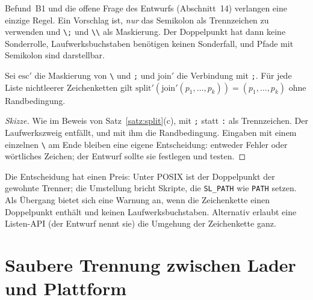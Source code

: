 Befund~B1 und die offene Frage des Entwurfs (Abschnitt~14) verlangen eine einzige Regel. Ein Vorschlag ist, \emph{nur} das Semikolon als Trennzeichen zu verwenden und \texttt{\textbackslash;} und \texttt{\textbackslash\textbackslash} als Maskierung. Der Doppelpunkt hat dann keine Sonderrolle, Laufwerksbuchstaben benötigen keinen Sonderfall, und Pfade mit Semikolon sind darstellbar.

\begin{satz}
	Sei $\mathrm{esc}'$ die Maskierung von \texttt{\textbackslash} und \texttt{;} und $\mathrm{join}'$ die Verbindung mit \texttt{;}. Für jede Liste nichtleerer Zeichenketten gilt $\mathrm{split}'(\mathrm{join}'(p_1,\ldots,p_k))=(p_1,\ldots,p_k)$ ohne Randbedingung.
\end{satz}

\begin{proof}[Skizze]
	Wie im Beweis von Satz~\ref{satz:split}(c), mit \texttt{;} statt \texttt{:} als Trennzeichen. Der Laufwerkszweig entfällt, und mit ihm die Randbedingung. Eingaben mit einem einzelnen \texttt{\textbackslash} am Ende bleiben eine eigene Entscheidung: entweder Fehler oder wörtliches Zeichen; der Entwurf sollte sie festlegen und testen.
\end{proof}

Die Entscheidung hat einen Preis: Unter POSIX ist der Doppelpunkt der gewohnte Trenner; die Umstellung bricht Skripte, die \texttt{SL\_PATH} wie \texttt{PATH} setzen. Als Übergang bietet sich eine Warnung an, wenn die Zeichenkette einen Doppelpunkt enthält und keinen Laufwerksbuchstaben. Alternativ erlaubt eine Listen-API (der Entwurf nennt sie) die Umgehung der Zeichenkette ganz.

\section{Saubere Trennung zwischen Lader und Plattform}
\label{sec:adapter-ausblick}

